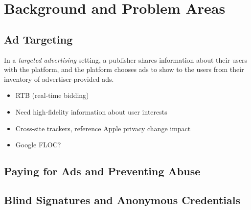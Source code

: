 \section{Background and Problem Areas}
\label{s:bg}

\subsection{Ad Targeting}

%
In a \emph{targeted advertising} setting, a publisher shares information about
their users with the platform, and the platform chooses ads to show to the
users from their inventory of advertiser-provided ads.
%

\begin{itemize}
  \item RTB (real-time bidding)
  \item Need high-fidelity information about user interests
  \item Cross-site trackers, reference Apple privacy change impact
  \item Google FLOC?
\end{itemize}

\subsection{Paying for Ads and Preventing Abuse}


%

%

\subsection{Blind Signatures and Anonymous Credentials}
\label{s:bg-crypto}

